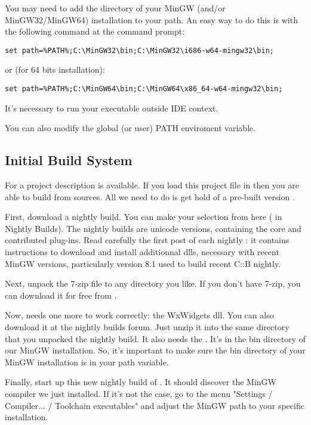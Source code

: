 You may need to add the  directory of your MinGW (and/or MinGW32/MinGW64) installation to your path. An easy way to do this is with the following command at the command prompt:

\begin{verbatim}
set path=%PATH%;C:\MinGW32\bin;C:\MinGW32\i686-w64-mingw32\bin;
\end{verbatim}
or (for 64 bits installation):
\begin{verbatim}
set path=%PATH%;C:\MinGW64\bin;C:\MinGW64\x86_64-w64-mingw32\bin;
\end{verbatim}

It's necessary to run your executable outside \codeblocks IDE context.

You can also modify the global (or user) PATH enviroment variable.


\subsection{Initial Build System}

For \cite{url:cb} a project description  is available. If you load this project file in \codeblocks then you are able to build \codeblocks from sources. All we need to do is get hold of a pre-built version \codeblocks.

First, download a nightly build. You can make your selection from here (\cite{url:cbforum} in Nightly Builds). The nightly builds are unicode versions, containing the core and contributed plug-ins. Read carefully the first post of each nightly : it contains instructions to download and install additionnal dlls, necessary with recent MinGW versions, particularly version 8.1 used to build recent C::B nightly.

Next, unpack the 7-zip file to any directory you like. If you don't have 7-zip, you can download it for free from \cite{url:zip}.

Now, \codeblocks needs one more  to work correctly: the WxWidgets dll. You can also download it at the nightly builds forum. Just unzip it into the same directory that you unpacked the \codeblocks nightly build. It also needs the . It's in the bin directory of our MinGW installation. So, it's important to make sure the bin directory of your MinGW installation is in your path variable.

Finally, start up this new nightly build of \codeblocks. It should discover the MinGW compiler we just installed. If it's not the case, go to the menu "Settings / Compiler... / Toolchain executables" and adjust the MinGW path to your specific installation.

